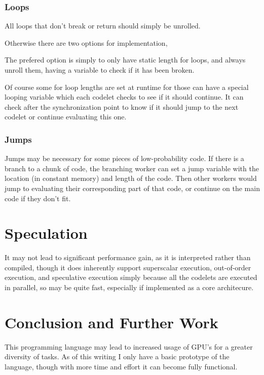 \subsubsection{Loops}
All loops that don't break or return should simply be unrolled. 

Otherwise there are two options for implementation, 

The prefered option is simply to only have static length for loops, 
and always unroll them, having a variable to check if it has been broken.  

Of course some for loop lengths are set at runtime
for those can have a special looping variable which each codelet checks to see
if it should continue. It can check after the synchronization point to know if
it should jump to the next codelet or continue evaluating this one. 

\subsubsection{Jumps}
Jumps may be necessary for some pieces of low-probability code. If there is a
branch to a chunk of code, the branching worker can set a jump variable with the
location (in constant memory) and length of the code.  Then other workers would
jump to evaluating their corresponding part of that code, or continue on the
main code if they don't fit. 


\section{Speculation}
It may not lead to significant performance gain, as it is interpreted rather
than compiled, though it does inherently support superscalar execution,
out-of-order execution, and speculative execution simply because all the
codelets are executed in parallel, so
may be quite fast, especially if implemented as a core architecure.

\section{Conclusion and Further Work}

This programming language may lead to increased usage of GPU's for a greater
diversity of tasks. 
As of this writing I only have a basic prototype of the language, though with
more time and effort it can become fully functional. 

